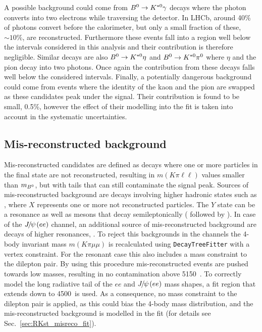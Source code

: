 A possible background could come from ${{B}^0} \rightarrow{\ensuremath{{K}^{*0}}}\gamma$ decays where the photon converts
into two electrons while traversing the detector. In LHCb, around 40\% of photons convert before the calorimeter,
but only a small fraction of these, $\sim 10\%$, are reconstructed. Furthermore these events fall
into a \qsq region well below the intervals considered in this analysis and their contribution is therefore negligible.
Similar decays are also $\Bz \to\Kstarz\eta$ and $\Bz \to\Kstarz\pi^0$ where $\eta$ and the pion decay into
two photons. Once again the contribution from these decays falls well below the considered \qsq intervals.
Finally, a potentially dangerous background could come from events where the
identity of the kaon and the pion are swapped as these candidates peak under the signal.
Their contribution is found to be small, 0.5\%, however the effect of their modelling into the fit
is taken into account in the systematic uncertainties.

\subsection{Mis-reconstructed background}
\label{sec:RKst_peaking_Dchains}

Mis-reconstructed candidates are defined as decays where one or more particles in the final state are not reconstructed,
resulting in $m(K\pi\ell\ell)$ values smaller than $m_{{{B}^0}}$, but with tails that can still contaminate the signal peak.
Sources of mis-reconstructed background are decays involving higher hadronic states such as 
, where $X$ represents one or more not reconstructed particles. 
The $Y$ state can be a \Kstar resonance as well as \D mesons that decay semileptonically (\eg \decay{\Bz}{\Dm\ell^+ \bar{\nu_\ell}}
followed by \decay{\Dm}{\Kstarz \ell^- \nu_\ell}). In case of the $\jpsi(ee)$ channel, an additional source of mis-reconstructed 
background are decays of higher \ccbar resonances, .
%
To reject this backgrounds in the \mm channels the 4-body invariant mass $m(K\pi\mu\mu)$ is recalculated using 
\verb!DecayTreeFitter! with a vertex constraint. For the resonant case this also includes a \jpsi mass constraint to the dilepton pair. 
By using this procedure mis-reconstructed events are pushed towards low masses, resulting in no contamination above 5150~\mevcc.
%
To correctly model the long radiative tail of the $ee$ and $\jpsi(ee)$ mass shapes, a fit region that extends down to 4500~\mevcc is used.
As a consequence, no mass constraint to the dilepton pair is applied, as this could bias the 4-body mass distribution, and the
mis-reconstructed background is modelled in the fit (for details see Sec.~\ref{sec:RKst_misreco_fit}).



